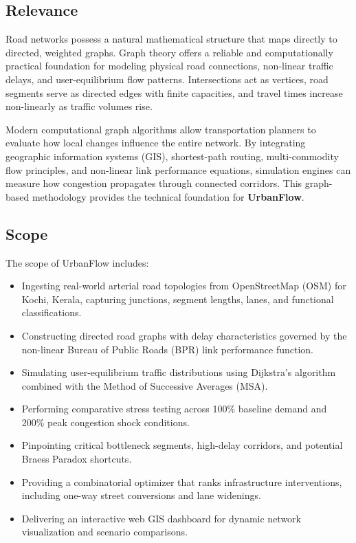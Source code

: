 \documentclass[12pt,a4paper]{report}
\begin{document}
\subsection*{Relevance}
Road networks possess a natural mathematical structure that maps directly to directed, weighted graphs. Graph theory offers a reliable and computationally practical foundation for modeling physical road connections, non-linear traffic delays, and user-equilibrium flow patterns. Intersections act as vertices, road segments serve as directed edges with finite capacities, and travel times increase non-linearly as traffic volumes rise. 

Modern computational graph algorithms allow transportation planners to evaluate how local changes influence the entire network. By integrating geographic information systems (GIS), shortest-path routing, multi-commodity flow principles, and non-linear link performance equations, simulation engines can measure how congestion propagates through connected corridors. This graph-based methodology provides the technical foundation for \textbf{UrbanFlow}.

\subsection*{Scope}
The scope of UrbanFlow includes:
\begin{itemize}
  \item Ingesting real-world arterial road topologies from OpenStreetMap (OSM) for Kochi, Kerala, capturing junctions, segment lengths, lanes, and functional classifications.
  \item Constructing directed road graphs with delay characteristics governed by the non-linear Bureau of Public Roads (BPR) link performance function.
  \item Simulating user-equilibrium traffic distributions using Dijkstra's algorithm combined with the Method of Successive Averages (MSA).
  \item Performing comparative stress testing across 100\% baseline demand and 200\% peak congestion shock conditions.
  \item Pinpointing critical bottleneck segments, high-delay corridors, and potential Braess Paradox shortcuts.
  \item Providing a combinatorial optimizer that ranks infrastructure interventions, including one-way street conversions and lane widenings.
  \item Delivering an interactive web GIS dashboard for dynamic network visualization and scenario comparisons.
\end{itemize}
\end{document}
